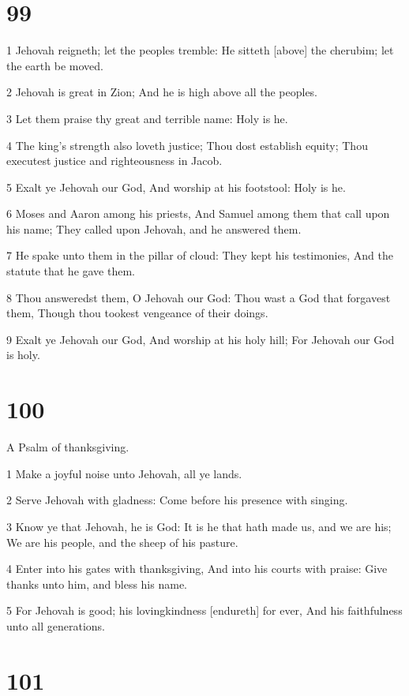 \chapter{99}

\par 1 Jehovah reigneth; let the peoples tremble: He sitteth [above] the cherubim; let the earth be moved.
\par 2 Jehovah is great in Zion; And he is high above all the peoples.
\par 3 Let them praise thy great and terrible name: Holy is he.
\par 4 The king's strength also loveth justice; Thou dost establish equity; Thou executest justice and righteousness in Jacob.
\par 5 Exalt ye Jehovah our God, And worship at his footstool: Holy is he.
\par 6 Moses and Aaron among his priests, And Samuel among them that call upon his name; They called upon Jehovah, and he answered them.
\par 7 He spake unto them in the pillar of cloud: They kept his testimonies, And the statute that he gave them.
\par 8 Thou answeredst them, O Jehovah our God: Thou wast a God that forgavest them, Though thou tookest vengeance of their doings.
\par 9 Exalt ye Jehovah our God, And worship at his holy hill; For Jehovah our God is holy.

\chapter{100}

\par A Psalm of thanksgiving.

\par 1 Make a joyful noise unto Jehovah, all ye lands.
\par 2 Serve Jehovah with gladness: Come before his presence with singing.
\par 3 Know ye that Jehovah, he is God: It is he that hath made us, and we are his; We are his people, and the sheep of his pasture.
\par 4 Enter into his gates with thanksgiving, And into his courts with praise: Give thanks unto him, and bless his name.
\par 5 For Jehovah is good; his lovingkindness [endureth] for ever, And his faithfulness unto all generations.

\chapter{101}

